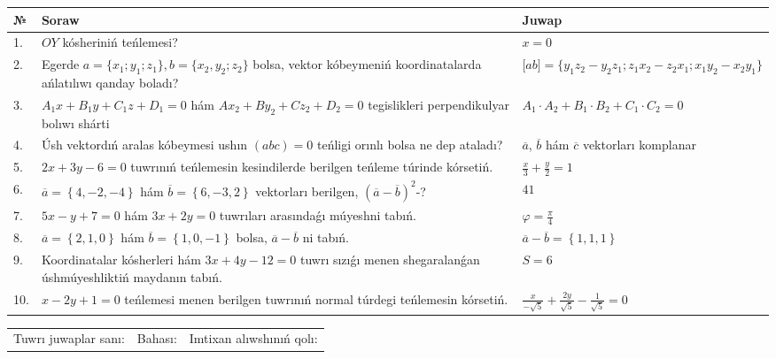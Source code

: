 \documentclass{article}
\begin{document}
\begin{tabular}{|m{0.7cm}|m{10cm}|m{4cm}|}
\hline
№ & Soraw & Juwap \\
\hline
1. & $OY$ kósheriniń teńlemesi? & $x=0$ \\
\hline
2. & Egerde $a=\{ x_1; y_1; z_1\}, b=\{ x_2, y_2; z_2\}$ bolsa, vektor kóbeymeniń koordinatalarda ańlatılıwı qanday boladı? &  $\lbrack ab\rbrack=\{y_1z_2-y_2z_1; z_1x_2-z_2x_1; x_1y_2-x_2y_1\}$ \\
\hline
3. & $A_1x+B_1y+C_1z+D_1=0$ hám $Ax_2+By_2+Cz_2+D_2=0$ tegislikleri perpendikulyar bolıwı shárti & $A_1\cdot A_2+B_1\cdot B_2+C_1\cdot C_2=0$ \\
\hline
4. & Úsh vektordıń aralas kóbeymesi ushın $(abc)=0$ teńligi orınlı bolsa ne dep ataladı? & $\overline{a}$, $\overline{b}$ hám $\overline{c}$ vektorları komplanar \\
\hline
5. & $2x+3y-6=0$ tuwrınıń teńlemesin kesindilerde berilgen teńleme túrinde kórsetiń. & $\frac{x}{3} + \frac{ y }{ 2 } =  1$ \\
\hline
6. & $\overline{a}=\left\{ 4,-2,-4 \right\}$ hám $\overline{b}=\left\{ 6,-3, 2 \right\}$ vektorları berilgen, $(\overline{a}-\overline{b}) ^{2}$-? & $41$ \\
\hline
7. & $5x-y+7=0$ hám $3x+2y=0$ tuwrıları arasındaǵı múyeshni tabıń. & $\varphi=\frac{\pi}{4}$ \\
\hline
8. & $\overline{a}=\left\{ 2, 1, 0 \right\}$ hám $\overline{b}=\left\{ 1, 0,-1 \right\}$ bolsa, $\overline{a}-\overline{b}$ ni tabıń. & $\overline{a} -\overline{b} = \left\{ 1,1,1 \right\}$ \\
\hline
9. & Koordinatalar kósherleri hám $ 3x+4y-12=0 $ tuwrı sızıǵı menen shegaralanǵan úshmúyeshliktiń maydanın tabıń. & $ S=6 $ \\
\hline
10. & $x-2y+1=0$ teńlemesi menen berilgen tuwrınıń normal túrdegi teńlemesin kórsetiń. & $\frac{x}{- \sqrt{5}}+\frac{2y}{\sqrt{5}}-\frac{1}{\sqrt{5}}=0$ \\
\hline
\end{tabular}

\vspace{1cm}

\begin{tabular}{lll}
Tuwrı juwaplar sanı: \underline{\hspace{1.5cm}} & 
Bahası: \underline{\hspace{1.5cm}} & 
Imtixan alıwshınıń qolı: \underline{\hspace{2cm}} \\
\end{tabular}
\end{document}
